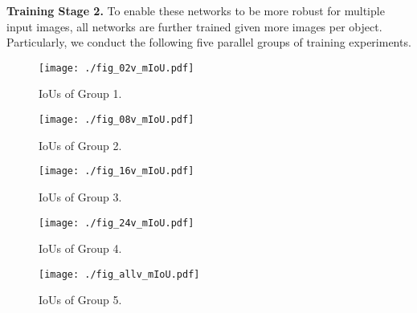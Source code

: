 \documentclass[twocolumn]{svjour3}    \pdfoutput=1
\begin{document}
\textbf{Training Stage 2.} To enable these networks to be more robust for multiple input images, all networks are further trained given more images per object. Particularly, we conduct the following five parallel groups of training experiments.

\begin{figure*}[!h]
	\setlength{\abovecaptionskip}{0 cm}
	\setlength{\belowcaptionskip}{-8pt}
	\begin{minipage}[t]{0.19\textwidth}
		\centerline{
			\texttt{[image: ./fig\_02v\_mIoU.pdf]}}
		\caption{IoUs of Group 1.}
		\label{fig:02v_mIoU}
	\end{minipage}
	\makebox[0.02in][]{}
	\begin{minipage}[t]{0.19\textwidth}
		\centerline{
			\texttt{[image: ./fig\_08v\_mIoU.pdf]}}
		\caption{IoUs of Group 2.}
        \label{fig:08v_mIoU}
	\end{minipage}
	\makebox[0.02in][]{}
	\begin{minipage}[t]{0.19\textwidth}
		\centerline{
			\texttt{[image: ./fig\_16v\_mIoU.pdf]}}
		\caption{IoUs of Group 3.}
        \label{fig:16v_mIoU}
	\end{minipage}
    \makebox[0.02in][]{}
	\begin{minipage}[t]{0.19\textwidth}
		\centerline{
			\texttt{[image: ./fig\_24v\_mIoU.pdf]}}
		\caption{IoUs of Group 4.}
        \label{fig:24v_mIoU}
	\end{minipage}
	\makebox[0.02in][]{}
	\begin{minipage}[t]{0.19\textwidth}
		\centerline{
			\texttt{[image: ./fig\_allv\_mIoU.pdf]}}
		\caption{\scriptsize{IoUs of Group} 5.}
        \label{fig:allv_mIoU}
	\end{minipage}
\vspace{-0.4cm}
\end{figure*}
\end{document}
